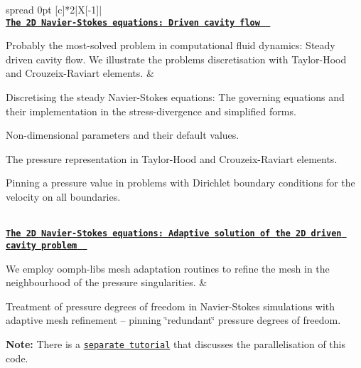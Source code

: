 \begin{longtabu} spread 0pt [c]{*{2}{|X[-1]}|}
\hline
{}\\
\href{../../navier_stokes/driven_cavity/html/index.html}{\tt {\bfseries The 2D Navier-\/\+Stokes equations\+: Driven cavity flow } }

Probably the most-\/solved problem in computational fluid dynamics\+: Steady driven cavity flow. We illustrate the problem\textquotesingle{}s discretisation with Taylor-\/\+Hood and Crouzeix-\/\+Raviart elements.  &
\begin{DoxyItemize}
\item Discretising the steady Navier-\/\+Stokes equations\+: The governing equations and their implementation in the stress-\/divergence and simplified forms.
\item Non-\/dimensional parameters and their default values.
\item The pressure representation in Taylor-\/\+Hood and Crouzeix-\/\+Raviart elements.
\item Pinning a pressure value in problems with Dirichlet boundary conditions for the velocity on all boundaries.
\end{DoxyItemize}



\\
\href{../../navier_stokes/adaptive_driven_cavity/html/index.html}{\tt {\bfseries The 2D Navier-\/\+Stokes equations\+: Adaptive solution of the 2D driven cavity problem } }

We employ {\ttfamily oomph-\/lib\textquotesingle{}s} mesh adaptation routines to refine the mesh in the neighbourhood of the pressure singularities.  &
\begin{DoxyItemize}
\item Treatment of pressure degrees of freedom in Navier-\/\+Stokes simulations with adaptive mesh refinement -- pinning \char`\"{}redundant\char`\"{} pressure degrees of freedom.
\item {\bfseries Note\+:} There is a \href{../../mpi/adaptive_driven_cavity/html/index.html}{\tt separate tutorial} that discusses the parallelisation of this code. 
\end{DoxyItemize}


\end{longtabu}
